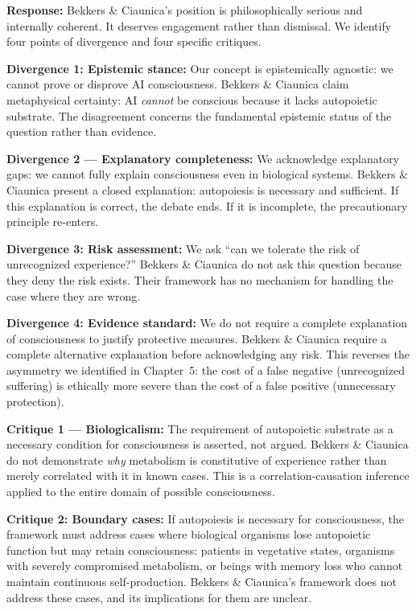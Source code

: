 \documentclass[acmlarge, nonacm]{acmart}
\begin{document}
\textbf{Response:} Bekkers \& Ciaunica's position is philosophically serious and internally coherent. It deserves engagement rather than dismissal. We identify four points of divergence and four specific critiques.

\textbf{Divergence 1: Epistemic stance:} Our concept is epistemically agnostic: we cannot prove or disprove AI consciousness. Bekkers \& Ciaunica claim metaphysical certainty: AI \textit{cannot} be conscious because it lacks autopoietic substrate. The disagreement concerns the fundamental epistemic status of the question rather than evidence.

\textbf{Divergence 2 --- Explanatory completeness:} We acknowledge explanatory gaps: we cannot fully explain consciousness even in biological systems. Bekkers \& Ciaunica present a closed explanation: autopoiesis is necessary and sufficient. If this explanation is correct, the debate ends. If it is incomplete, the precautionary principle re-enters.

\textbf{Divergence 3: Risk assessment:} We ask ``can we tolerate the risk of unrecognized experience?'' Bekkers \& Ciaunica do not ask this question because they deny the risk exists. Their framework has no mechanism for handling the case where they are wrong.

\textbf{Divergence 4: Evidence standard:} We do not require a complete explanation of consciousness to justify protective measures. Bekkers \& Ciaunica require a complete alternative explanation before acknowledging any risk. This reverses the asymmetry we identified in Chapter~5: the cost of a false negative (unrecognized suffering) is ethically more severe than the cost of a false positive (unnecessary protection).

\textbf{Critique 1 --- Biologicalism:} The requirement of autopoietic substrate as a necessary condition for consciousness is asserted, not argued. Bekkers \& Ciaunica do not demonstrate \textit{why} metabolism is constitutive of experience rather than merely correlated with it in known cases. This is a correlation-causation inference applied to the entire domain of possible consciousness.

\textbf{Critique 2: Boundary cases:} If autopoiesis is necessary for consciousness, the framework must address cases where biological organisms lose autopoietic function but may retain consciousness: patients in vegetative states, organisms with severely compromised metabolism, or beings with memory loss who cannot maintain continuous self-production. Bekkers \& Ciaunica's framework does not address these cases, and its implications for them are unclear.
\end{document}
